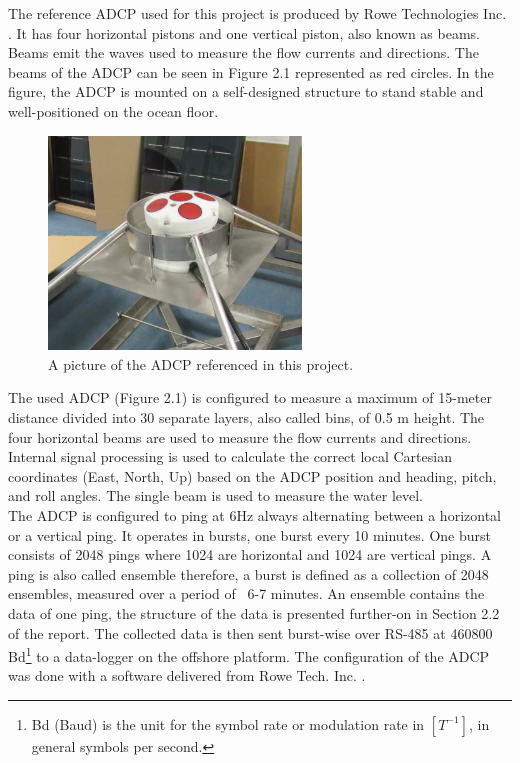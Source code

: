 The reference ADCP used for this project is produced by Rowe Technologies Inc. \cite{rowe}. It has four horizontal pistons and one vertical piston, also known as beams. Beams emit the waves used to measure the flow currents and directions. The beams of the ADCP can be seen in Figure 2.1 represented as red circles. In the figure, the ADCP is mounted on a self-designed structure to stand stable and well-positioned on the ocean floor.

\begin{figure}[h]
\centering
      \includegraphics[width=0.6\textwidth]{adcp}
        \caption{A picture of the ADCP referenced in this project.}
\end{figure}

The used ADCP (Figure 2.1) is configured to measure a maximum of 15-meter distance divided into 30 separate layers, also called bins, of 0.5 m height. The four horizontal beams are used to measure the flow currents and directions. Internal signal processing is used to calculate the correct local Cartesian coordinates (East, North, Up) based on the ADCP position and heading, pitch, and roll angles. The single beam is used to measure the water level.\\
The ADCP is configured to ping at 6Hz always alternating between a horizontal or a vertical ping. It operates in bursts, one burst every 10 minutes. One burst consists of 2048 pings where 1024 are horizontal and 1024 are vertical pings. A ping is also called ensemble therefore, a burst is defined as a collection of 2048 ensembles, measured over a period of ~6-7 minutes. An ensemble contains the data of one ping, the structure of the data is presented further-on in Section 2.2 of the report. The collected data is then sent burst-wise over RS-485 at 460800 Bd\footnote{\label{foot:2} Bd (Baud) is the unit for the symbol rate or modulation rate in $[T^{-1}]$, in general symbols per second.} to a data-logger on the offshore platform. The configuration of the ADCP was done with a software delivered from Rowe Tech. Inc. \cite{rowe_git}. 

